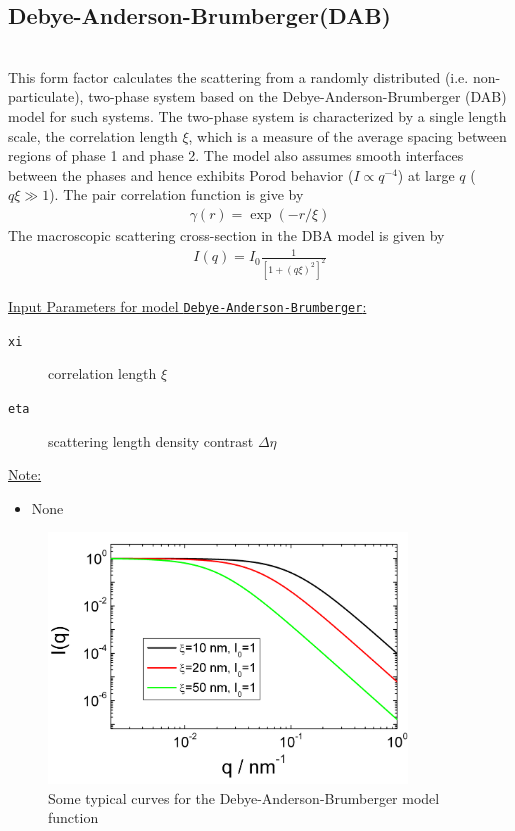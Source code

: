 
\clearpage
\subsection{Debye-Anderson-Brumberger(DAB)}
\label{sect:DAB}~\\

This form factor calculates the scattering from a randomly
distributed (i.e. non-particulate), two-phase system based on the
Debye-Anderson-Brumberger (DAB) \cite{DAB1957,DebyeBueche1949} model
for such systems. The two-phase system is characterized by a single
length scale, the correlation length $\xi$, which is a measure of
the average spacing between regions of phase 1 and phase 2. The
model also assumes smooth interfaces between the phases and hence
exhibits Porod behavior ($I \propto q^{-4}$) at large $q$ ($q \xi
\gg 1$). The pair correlation function is give by
\cite{DebyeBueche1949}
\begin{align}
\gamma(r) = \exp(-r/\xi)
\end{align}
The macroscopic scattering cross-section in the DBA model is given
by
\begin{align}
I(q) = I_0 \frac{1}{\left[1+(q\xi)^2\right]^2}
\end{align}


\underline{Input Parameters for model \texttt{Debye-Anderson-Brumberger}:}\\
\begin{description}
\item[\texttt{xi}] correlation length $\xi$
\item[\texttt{eta}] scattering length density contrast $\Delta\eta$
\end{description}

\underline{Note:}
\begin{itemize}
\item None
\end{itemize}


\begin{figure}[htb]
\begin{center}
\includegraphics[width=0.85\textwidth,height=0.6\textwidth]{DAB.png}
\end{center}
\caption{Some typical curves for the Debye-Anderson-Brumberger model function} \label{fig:DABIq}
\end{figure}


